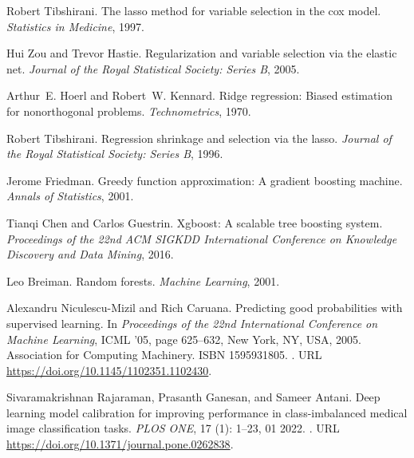 \documentclass{article}
\begin{document}
\begin{thebibliography}{60}
Robert Tibshirani.
\newblock The lasso method for variable selection in the cox model.
\newblock \emph{Statistics in Medicine}, 1997.

Hui Zou and Trevor Hastie.
\newblock Regularization and variable selection via the elastic net.
\newblock \emph{Journal of the Royal Statistical Society: Series B}, 2005.

Arthur~E. Hoerl and Robert~W. Kennard.
\newblock Ridge regression: Biased estimation for nonorthogonal problems.
\newblock \emph{Technometrics}, 1970.

Robert Tibshirani.
\newblock Regression shrinkage and selection via the lasso.
\newblock \emph{Journal of the Royal Statistical Society: Series B}, 1996.

Jerome Friedman.
\newblock Greedy function approximation: A gradient boosting machine.
\newblock \emph{Annals of Statistics}, 2001.

Tianqi Chen and Carlos Guestrin.
\newblock Xgboost: A scalable tree boosting system.
\newblock \emph{Proceedings of the 22nd ACM SIGKDD International Conference on
  Knowledge Discovery and Data Mining}, 2016.

Leo Breiman.
\newblock Random forests.
\newblock \emph{Machine Learning}, 2001.

Alexandru Niculescu-Mizil and Rich Caruana.
\newblock Predicting good probabilities with supervised learning.
\newblock In \emph{Proceedings of the 22nd International Conference on Machine
  Learning}, ICML '05, page 625–632, New York, NY, USA, 2005. Association for
  Computing Machinery.
\newblock ISBN 1595931805.
\newblock {}.
\newblock URL \url{https://doi.org/10.1145/1102351.1102430}.

Sivaramakrishnan Rajaraman, Prasanth Ganesan, and Sameer Antani.
\newblock Deep learning model calibration for improving performance in
  class-imbalanced medical image classification tasks.
\newblock \emph{PLOS ONE}, 17 (1): 1--23, 01 2022.
\newblock {}.
\newblock URL \url{https://doi.org/10.1371/journal.pone.0262838}.


\end{thebibliography}
\end{document}

